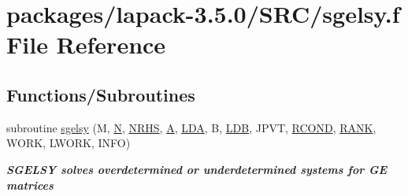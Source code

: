 \hypertarget{sgelsy_8f}{}\section{packages/lapack-\/3.5.0/\+S\+R\+C/sgelsy.f File Reference}
\label{sgelsy_8f}
\subsection*{Functions/\+Subroutines}
\begin{DoxyCompactItemize}
\item 
subroutine \hyperlink{group__realGEsolve_gaebb028f1d50049bcf4780ffc8cb4f750}{sgelsy} (M, \hyperlink{polmisc_8c_a0240ac851181b84ac374872dc5434ee4}{N}, \hyperlink{example__user_8c_aa0138da002ce2a90360df2f521eb3198}{N\+R\+H\+S}, \hyperlink{classA}{A}, \hyperlink{example__user_8c_ae946da542ce0db94dced19b2ecefd1aa}{L\+D\+A}, B, \hyperlink{example__user_8c_a50e90a7104df172b5a89a06c47fcca04}{L\+D\+B}, J\+P\+V\+T, \hyperlink{superlu__enum__consts_8h_af00a42ecad444bbda75cde1b64bd7e72a9b5c151728d8512307565994c89919d5}{R\+C\+O\+N\+D}, \hyperlink{splinemodule_8c_a3a88bcc63386de30443dacede2e01847}{R\+A\+N\+K}, W\+O\+R\+K, L\+W\+O\+R\+K, I\+N\+F\+O)
\begin{DoxyCompactList}\small\item\em {\bfseries  S\+G\+E\+L\+S\+Y solves overdetermined or underdetermined systems for G\+E matrices} \end{DoxyCompactList}\end{DoxyCompactItemize}
